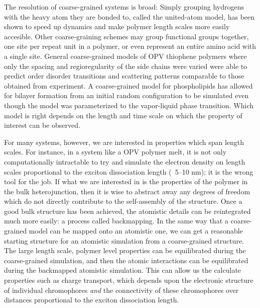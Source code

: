 The resolution of coarse-grained systems is broad:
Simply grouping hydrogens with the heavy atom they are bonded to, called the united-atom model, has been shown to speed up dynamics and make polymer length scales more easily accesible\cite{Paul1995a, Yang2006a}.
Other coarse-graining schemes may group functional groups together\cite{Berendsen2010, Jankowski2013, Marsh2014}, one site per repeat unit in a polymer\cite{Lee2011}, or even represent an entire amino acid with a single site\cite{Peng2019}.
General coarse-grained models of OPV thiophene polymers where only the spacing and regioregularity of the side chains were varied were able to predict order disorder transitions and scattering patterns comparable to those obtained from experiment\cite{Jankowski2013, Marsh2014}.
A coarse-grained model for phospholipids has allowed for bilayer formation from an initial random configuration to be simulated even though the model was parameterized to the vapor-liquid phase transition\cite{Shelley2001}.
Which model is right depends on the length and time scale on which the property of interest can be observed.

For many systems, however, we are interested in properties which span length scales.
For instance, in a system like a OPV polymer melt, it is not only computationally intractable to try and simulate the electron density on length scales proportional to the exciton dissociation length (~5--10 nm)\cite{Huang2010}; it is the wrong tool for the job.
If what we are interested in is the properties of the polymer in the bulk heterojunction, then it is wise to abstract away any degrees of freedom which do not directly contribute to the self-assembly of the structure.
Once a good bulk structure has been achieved, the atomistic details can be reintegrated much more easily: a process called backmapping.
In the same way that a coarse-grained model can be mapped onto an atomistic one, we can get a reasonable starting structure for an atomistic simulation from a coarse-grained structure.
The large length scale, polymer level properties can be equilibrated during the coarse-grained simulation, and then the atomic interactions can be equilibrated during the backmapped atomistic simulation.
This can allow us the calculate properties such as charge transport, which depends upon the electronic structure of individual chromophores \textit{and} the connectivity of these chromophores over distances proportional to the exciton dissociation length.


